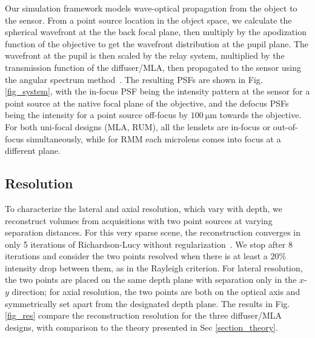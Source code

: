 \documentclass{osa-article}
\begin{document}
Our simulation framework models wave-optical propagation from the object to the sensor. From a point source location in the object space, we calculate the spherical wavefront at the the back focal plane, then multiply by the apodization function of the objective to get the wavefront distribution at the pupil plane. The wavefront at the pupil is then scaled by the relay system, multiplied by the transmission function of the diffuser/MLA, then propagated to the sensor using the angular spectrum method~\cite{goodman2005FourierOptics}. The resulting PSFs are shown in Fig. \ref{fig_system}, with the in-focus PSF being the intensity pattern at the sensor for a point source at the native focal plane of the objective, and the defocus PSFs being the intensity for a point source off-focus by $\SI{100}{\micro\meter}$ towards the objective. For both uni-focal designs (MLA, RUM), all the lenslets are in-focus or out-of-focus simultaneously, while for RMM each microlens comes into focus at a different plane. 

\subsection{Resolution}
To characterize the lateral and axial resolution, which vary with depth, we reconstruct volumes from acquisitions with two point sources at varying separation distances. For this very sparse scene, the reconstruction converges in only 5 iterations of Richardson-Lucy without regularization~\cite{richardson1972rl,lucy1974rl}. We stop after 8 iterations and consider the two points resolved when there is at least a $20 \% $ intensity drop between them, as in the Rayleigh criterion. For lateral resolution, the two points are placed on the same depth plane with separation only in the $x$-$y$ direction; for axial resolution, the two points are both on the optical axis and symmetrically set apart from the designated depth plane. The results in Fig. \ref{fig_res} compare the reconstruction resolution for the three diffuser/MLA designs, with comparison to the theory presented in Sec \ref{section_theory}.
\end{document}
